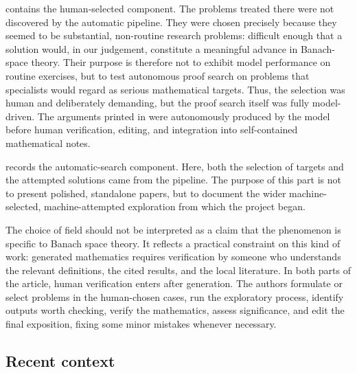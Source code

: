 \documentclass[11pt,reqno]{amsart}
\theoremstyle{plain}
\theoremstyle{definition}
\begin{document}
 contains the human-selected component.  The problems treated there were not discovered by the automatic pipeline. They were chosen precisely because they seemed to be substantial, non-routine research problems: difficult enough that a solution would, in our judgement, constitute a meaningful advance in Banach-space theory. Their purpose is therefore not to exhibit model performance on routine exercises, but to test autonomous proof search on problems that specialists would regard as serious mathematical targets. Thus, the selection was human and deliberately demanding, but the proof search itself was fully model-driven. The arguments printed in  were autonomously produced by the model before human verification, editing, and integration into self-contained mathematical notes.

 records the automatic-search component. Here, both the selection of targets and the attempted solutions came from the pipeline.  The purpose of this part is not to present polished, standalone papers, but to document the wider machine-selected, machine-attempted exploration from which the project began. 

The choice of field should not be interpreted as a claim that the phenomenon is specific to Banach space theory. It reflects a practical constraint on this kind of work: generated mathematics requires verification by someone who understands the relevant definitions, the cited results, and the local literature.  In both parts of the article, human verification enters after generation.  The authors formulate or select problems in the human-chosen cases, run the exploratory process, identify outputs worth checking, verify the mathematics, assess significance, and edit the final exposition, fixing some minor mistakes whenever necessary.

\subsection{Recent context}\label{sec:historical-background}
\end{document}
